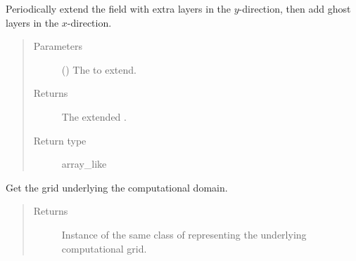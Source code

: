 \documentclass[letterpaper,10pt,english]{sphinxmanual}
\begin{document}
\begin{fulllineitems}
\begin{fulllineitems}
\end{fulllineitems}


\begin{fulllineitems}
\label{\detokenize{api:tasmania.dycore.horizontal_boundary_periodic.PeriodicYZ.from_physical_to_computational_domain}}
Periodically extend the field  with  extra layers in the \(y\)-direction,
then add  ghost layers in the \(x\)-direction.
\begin{quote}\begin{description}
\item[{Parameters}] \leavevmode
{} () \textendash{} The  to extend.

\item[{Returns}] \leavevmode
The extended .

\item[{Return type}] \leavevmode
array\_like

\end{description}\end{quote}

\end{fulllineitems}


\begin{fulllineitems}
\label{\detokenize{api:tasmania.dycore.horizontal_boundary_periodic.PeriodicYZ.get_computational_grid}}
Get the  grid underlying the computational domain.
\begin{quote}\begin{description}
\item[{Returns}] \leavevmode
Instance of the same class of 
representing the underlying computational grid.


\end{description}
\end{quote}
\end{fulllineitems}
\end{fulllineitems}
\end{document}
